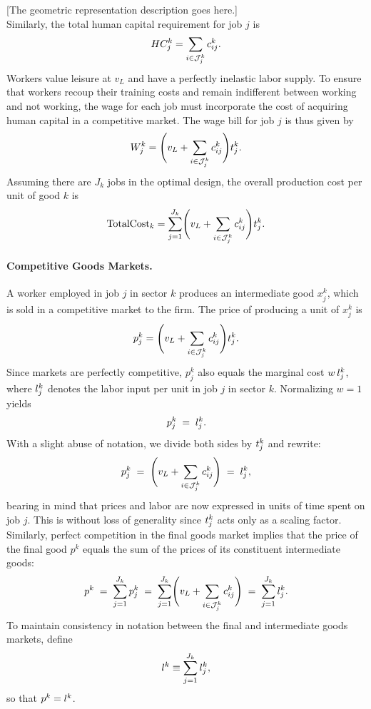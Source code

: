 \documentclass{article}
\theoremstyle{plain}
\theoremstyle{plain}
\begin{document}
[The geometric representation description goes here.] \\

Similarly, the total human capital requirement for job \(j\) is
\[
HC_j^k = \sum_{i \in \mathcal{J}_j^k} c_{ij}^{k}.
\]
Workers value leisure at $v_L$ and have a perfectly inelastic labor supply.  
To ensure that workers recoup their training costs and remain indifferent between working and not working, the wage for each job must incorporate the cost of acquiring human capital in a competitive market.  
The wage bill for job $j$ is thus given by
\[
W_j^k = \Biggl(v_L + \sum_{i \in \mathcal{J}_j^k} c_{ij}^{k} \Biggr) t_{j}^k.
\]
Assuming there are $J_k$ jobs in the optimal design, the overall production cost per unit of good $k$ is
\[
\text{TotalCost}_k = \sum_{j=1}^{J_k} \Biggl( v_L + \sum_{i \in \mathcal{J}_j^k} c_{ij}^{k}\Biggr) t_{j}^k.
\]

\paragraph{Competitive Goods Markets.}

A worker employed in job $j$ in sector $k$ produces an intermediate good $x_j^k$, which is sold in a competitive market to the firm.  
The price of producing a unit of $x_j^k$ is
\[
p_j^k = \Biggl( v_L + \sum_{i \in \mathcal{J}_j^k} c_{ij}^{k} \Biggr) t_{j}^k.
\]
Since markets are perfectly competitive, $p_j^k$ also equals the marginal cost $w\,l_{j}^k$, where $l_{j}^k$ denotes the labor input per unit in job $j$ in sector $k$.  
Normalizing $w=1$ yields
\[
p_j^k \;=\; l_{j}^k.
\]
With a slight abuse of notation, we divide both sides by $t_{j}^k$ and rewrite:
\[
p_j^k \;=\; \Biggl( v_L + \sum_{i \in \mathcal{J}_j^k} c_{ij}^{k} \Biggr) \;=\; l_{j}^k,
\]
bearing in mind that prices and labor are now expressed in units of time spent on job $j$.  
This is without loss of generality since $t_{j}^k$ acts only as a scaling factor.  
Similarly, perfect competition in the final goods market implies that the price of the final good $p^k$ equals the sum of the prices of its constituent intermediate goods:
\[
p^k \;=\; \sum_{j=1}^{J_k} p_j^k \;=\; \sum_{j=1}^{J_k} \Biggl( v_L + \sum_{i \in \mathcal{J}_j^k} c_{ij}^{k}\Biggr) \;=\; \sum_{j=1}^{J_k} l_{j}^k.
\]
To maintain consistency in notation between the final and intermediate goods markets, define
\[
l_{}^k \equiv \sum_{j=1}^{J_k} l_{j}^k,
\]
so that $p^k = l_{}^k$.
\end{document}
